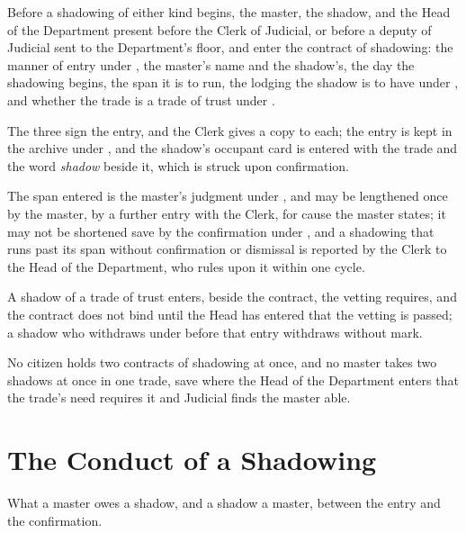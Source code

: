 \begin{clauses}
\item Before a shadowing of either kind begins, the master, the shadow, and the Head of the Department present before the Clerk of Judicial, or before a deputy of Judicial sent to the Department's floor, and enter the contract of shadowing: the manner of entry under , the master's name and the shadow's, the day the shadowing begins, the span it is to run, the lodging the shadow is to have under , and whether the trade is a trade of trust under .
\item The three sign the entry, and the Clerk gives a copy to each; the entry is kept in the archive under , and the shadow's occupant card is entered with the trade and the word \emph{shadow} beside it, which is struck upon confirmation.
\item The span entered is the master's judgment under , and may be lengthened once by the master, by a further entry with the Clerk, for cause the master states; it may not be shortened save by the confirmation under , and a shadowing that runs past its span without confirmation or dismissal is reported by the Clerk to the Head of the Department, who rules upon it within one cycle.
\item A shadow of a trade of trust enters, beside the contract, the vetting  requires, and the contract does not bind until the Head has entered that the vetting is passed; a shadow who withdraws under  before that entry withdraws without mark.
\item No citizen holds two contracts of shadowing at once, and no master takes two shadows at once in one trade, save where the Head of the Department enters that the trade's need requires it and Judicial finds the master able.
\end{clauses}

\section{The Conduct of a Shadowing}
\label{sec:labor:conduct-of-a-shadowing}

What a master owes a shadow, and a shadow a master, between the entry and the confirmation.

